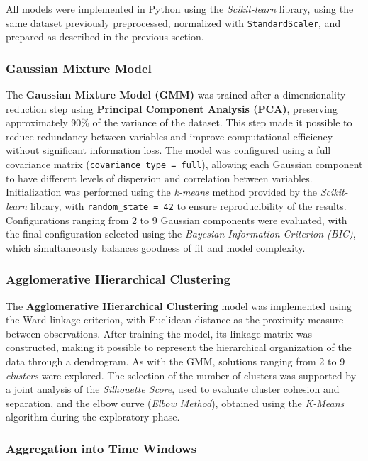 \documentclass[a4paper,fleqn]{cas-sc}
\begin{document}
All models were implemented in Python using the \textit{Scikit-learn} library, using the same dataset previously preprocessed, normalized with \texttt{StandardScaler}, and prepared as described in the previous section.

\subsubsection{Gaussian Mixture Model}

The \textbf{Gaussian Mixture Model (GMM)} was trained after a dimensionality-reduction step using \textbf{Principal Component Analysis (PCA)}, preserving approximately 90\% of the variance of the dataset. This step made it possible to reduce redundancy between variables and improve computational efficiency without significant information loss. The model was configured using a full covariance matrix (\texttt{covariance\_type = full}), allowing each Gaussian component to have different levels of dispersion and correlation between variables. Initialization was performed using the \textit{k-means} method provided by the \textit{Scikit-learn} library, with \texttt{random\_state = 42} to ensure reproducibility of the results. Configurations ranging from 2 to 9 Gaussian components were evaluated, with the final configuration selected using the \textit{Bayesian Information Criterion (BIC)}, which simultaneously balances goodness of fit and model complexity.

\subsubsection{Agglomerative Hierarchical Clustering}

The \textbf{Agglomerative Hierarchical Clustering} model was implemented using the Ward linkage criterion, with Euclidean distance as the proximity measure between observations. After training the model, its linkage matrix was constructed, making it possible to represent the hierarchical organization of the data through a dendrogram. As with the GMM, solutions ranging from 2 to 9 \textit{clusters} were explored. The selection of the number of clusters was supported by a joint analysis of the \textit{Silhouette Score}, used to evaluate cluster cohesion and separation, and the elbow curve (\textit{Elbow Method}), obtained using the \textit{K-Means} algorithm during the exploratory phase.

\subsubsection{Aggregation into Time Windows}
\end{document}
